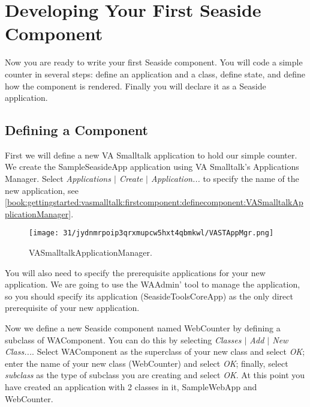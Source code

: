 \documentclass[a4paper,10pt,twoside]{book}
\newcommand{\ct}[1]{{\small\ttfamily\textup{#1}}}
\begin{document}
\section{Developing Your First Seaside Component}
\label{book:gettingstarted:vasmalltalk:firstcomponent}

Now you are ready to write your first Seaside component. You will code a simple counter in several steps: define an application and a class, define state, and define how the component is rendered. Finally you will declare it as a Seaside application.

\subsection{Defining a Component}
\label{book:gettingstarted:vasmalltalk:firstcomponent:definecomponent}

First we will define a new VA Smalltalk application to hold our simple counter. We create the SampleSeasideApp application using VA Smalltalk's Applications Manager.  Select \textit{Applications $|$ Create $|$ Application...} to specify the name of the new application, see \autoref{book:gettingstarted:vasmalltalk:firstcomponent:definecomponent:VASmalltalkApplicationManager}.

\begin{figure}[h!tbp]
	\begin{center}
		\texttt{[image: 31/jydnmrpoip3qrxmupcw5hxt4qbmkwl/VASTAppMgr.png]}
		\caption{VASmalltalkApplicationManager.\label{book:gettingstarted:vasmalltalk:firstcomponent:definecomponent:VASmalltalkApplicationManager}}
	\end{center}
\end{figure}


You will also need to specify the prerequisite applications for your new application.  We are going to use the \ct{WAAdmin}' tool to manage the application, so you should specify its application (\ct{SeasideToolsCoreApp}) as the only direct prerequisite of your new application.

Now we define a new Seaside component named \ct{WebCounter} by defining a subclass of \ct{WAComponent}. You can do this by selecting \textit{Classes $|$ Add $|$ New Class...}.  Select \ct{WAComponent} as the superclass of your new class and select \textit{OK}; enter the name of your new class (\ct{WebCounter}) and select \textit{OK}; finally, select \textit{subclass} as the type of subclass you are creating and select \textit{OK}.  At this point you have created an application with 2 classes in it, \ct{SampleWebApp} and \ct{WebCounter}.
\end{document}
